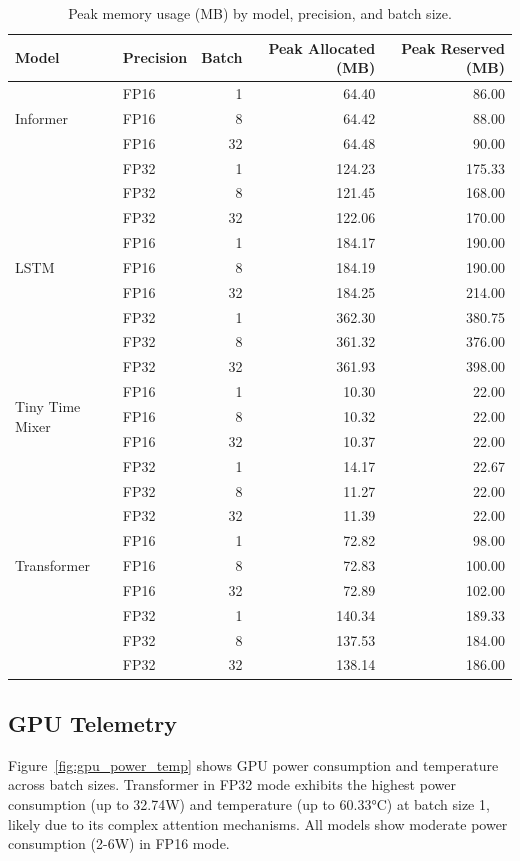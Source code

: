 \documentclass[10pt,a4paper]{article}
\begin{document}
\begin{table}[H]
\centering
\footnotesize
\caption{Peak memory usage (MB) by model, precision, and batch size.}
\label{tab:memory}
\begin{tabular}{llrrr}
\toprule
Model & Precision & Batch & Peak Allocated (MB) & Peak Reserved (MB) \\
\midrule
\multirow{3}{*}{Informer} & FP16 & 1 & 64.40 & 86.00 \\
 & FP16 & 8 & 64.42 & 88.00 \\
 & FP16 & 32 & 64.48 & 90.00 \\
\midrule
 & FP32 & 1 & 124.23 & 175.33 \\
 & FP32 & 8 & 121.45 & 168.00 \\
 & FP32 & 32 & 122.06 & 170.00 \\
\midrule
\multirow{3}{*}{LSTM} & FP16 & 1 & 184.17 & 190.00 \\
 & FP16 & 8 & 184.19 & 190.00 \\
 & FP16 & 32 & 184.25 & 214.00 \\
\midrule
 & FP32 & 1 & 362.30 & 380.75 \\
 & FP32 & 8 & 361.32 & 376.00 \\
 & FP32 & 32 & 361.93 & 398.00 \\
\midrule
\multirow{3}{*}{Tiny Time Mixer} & FP16 & 1 & 10.30 & 22.00 \\
 & FP16 & 8 & 10.32 & 22.00 \\
 & FP16 & 32 & 10.37 & 22.00 \\
\midrule
 & FP32 & 1 & 14.17 & 22.67 \\
 & FP32 & 8 & 11.27 & 22.00 \\
 & FP32 & 32 & 11.39 & 22.00 \\
\midrule
\multirow{3}{*}{Transformer} & FP16 & 1 & 72.82 & 98.00 \\
 & FP16 & 8 & 72.83 & 100.00 \\
 & FP16 & 32 & 72.89 & 102.00 \\
\midrule
 & FP32 & 1 & 140.34 & 189.33 \\
 & FP32 & 8 & 137.53 & 184.00 \\
 & FP32 & 32 & 138.14 & 186.00 \\
\bottomrule
\end{tabular}
\end{table}

\subsection{GPU Telemetry}
Figure~\ref{fig:gpu_power_temp} shows GPU power consumption and temperature across batch sizes. Transformer in FP32 mode exhibits the highest power consumption (up to 32.74W) and temperature (up to 60.33°C) at batch size 1, likely due to its complex attention mechanisms. All models show moderate power consumption (2-6W) in FP16 mode.
\end{document}
